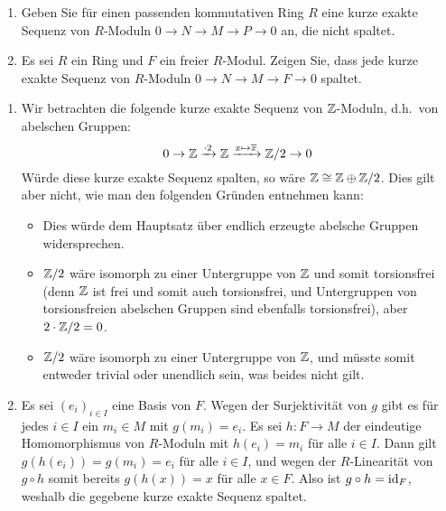\begin{question}[subtitle = Zum Spalten kurzer exakter Sequenzen]
  \begin{enumerate}
    \item
      Geben Sie für einen passenden kommutativen Ring $R$ eine kurze exakte Sequenz von $R$-Moduln $0 \to N \to M \to P \to 0$ an, die nicht spaltet.
    \item
      Es sei $R$ ein Ring und $F$ ein freier $R$-Modul.
      Zeigen Sie, dass jede kurze exakte Sequenz von $R$-Moduln $0 \to N \to M \to F \to 0$ spaltet.
  \end{enumerate}
\end{question}


\begin{solution}
  \begin{enumerate}
    \item
      Wir betrachten die folgende kurze exakte Sequenz von $\mathbb{Z}$-Moduln, d.h.\ von abelschen Gruppen:
      \[
                                              0
        \to                                   \mathbb{Z}
        \xrightarrow{\cdot 2}                 \mathbb{Z}
        \xrightarrow{x \mapsto \overline{x}}  \mathbb{Z}/2
        \to                                   0
      \]
      Würde diese kurze exakte Sequenz spalten, so wäre $\mathbb{Z} \cong \mathbb{Z} \oplus \mathbb{Z}/2$.
      Dies gilt aber nicht, wie man den folgenden Gründen entnehmen kann:
      \begin{itemize}
        \item
          Dies würde dem Hauptsatz über endlich erzeugte abelsche Gruppen widersprechen.
        \item
          $\mathbb{Z}/2$ wäre isomorph zu einer Untergruppe von $\mathbb{Z}$ und somit torsionsfrei (denn $\mathbb{Z}$ ist frei und somit auch torsionsfrei, und Untergruppen von torsionsfreien abelschen Gruppen sind ebenfalls torsionsfrei), aber $2 \cdot \mathbb{Z}/2 = 0$.
        \item
          $\mathbb{Z}/2$ wäre isomorph zu einer Untergruppe von $\mathbb{Z}$, und müsste somit entweder trivial oder unendlich sein, was beides nicht gilt.
      \end{itemize}
    \item
      Es sei $(e_i)_{i \in I}$ eine Basis von $F$.
      Wegen der Surjektivität von $g$ gibt es für jedes $i \in I$ ein $m_i \in M$ mit $g(m_i) = e_i$.
      Es sei $h \colon F \to M$ der eindeutige Homomorphismus von $R$-Moduln mit $h(e_i) = m_i$ für alle $i \in I$.
      Dann gilt $g(h(e_i)) = g(m_i) = e_i$ für alle $i \in I$, und wegen der $R$-Linearität von $g \circ h$ somit bereits $g(h(x)) = x$ für alle $x \in F$.
      Also ist $g \circ h = \operatorname{id}_F$, weshalb die gegebene kurze exakte Sequenz spaltet.
  \end{enumerate}
\end{solution}


